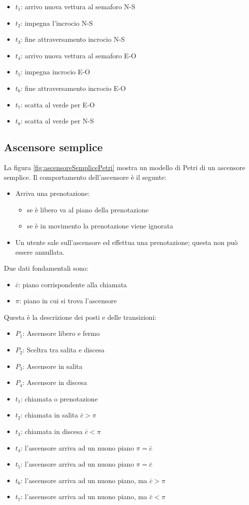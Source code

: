 \documentclass[a4paper]{report}
\begin{document}
\begin{itemize}
\item $t_1$: arrivo nuova vettura al semaforo N-S
\item $t_2$: impegna l'incrocio N-S
\item $t_3$: fine attraversamento incrocio N-S
\item $t_4$: arrivo nuova vettura al semaforo E-O
\item $t_5$: impegna incrocio E-O
\item $t_6$: fine attraversamento incrocio E-O
\item $t_7$: scatta al verde per E-O
\item $t_8$: scatta al verde per N-S
\end{itemize}

\subsection{Ascensore semplice}

La figura \ref{fig:ascensoreSemplicePetri} mostra un modello di Petri
di un ascensore semplice. Il comportamento
dell'ascensore \`e il segunte:
\begin{itemize}
\item Arriva una prenotazione:
  \begin{itemize}
  \item se \`e libero va al piano della prenotazione
  \item se \`e in movimento la prenotazione viene ignorata
  \end{itemize}
\item Un utente sale sull'ascensore ed effettua una prenotazione;
  questa non pu\`o essere annullata.
\end{itemize}
Due dati fondamentali sono:
\begin{itemize}
\item $\bar{c}$: piano corrispondente alla chiamata
\item $\pi$: piano in cui si trova l'ascensore
\end{itemize}
Questa \`e la descrizione dei posti e delle transizioni:
\begin{itemize}
\item $P_1$: Ascensore libero e fermo
\item $P_2$: Sceltra tra salita e discesa
\item $P_3$: Ascensore in salita
\item $P_4$: Ascensore in discesa
\item $t_1$: chiamata o prenotazione
\item $t_2$: chiamata in salita $\bar{c} > \pi$
\item $t_3$: chiamata in discesa $\bar{c} < \pi$
\item $t_4$: l'ascensore arriva ad un nuono piano $\pi = \bar{c}$
\item $t_5$: l'ascensore arriva ad un nuono piano $\pi = \bar{c}$
\item $t_6$: l'ascensore arriva ad un nuono piano, ma $\bar{c} > \pi$
\item $t_7$: l'ascensore arriva ad un nuono piano, ma $\bar{c} < \pi$
\end{itemize}
\end{document}
